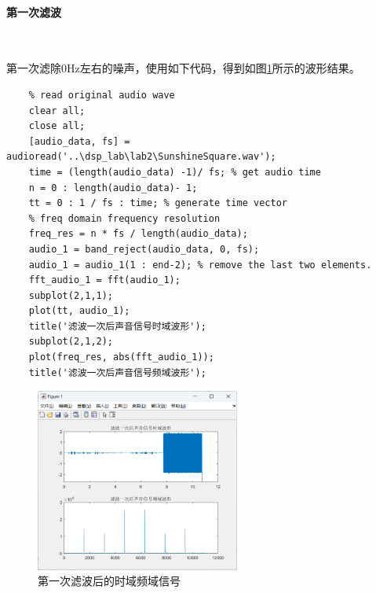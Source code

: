 \documentclass[UTF8]{ctexart}
\begin{document}
\paragraph{第一次滤波}~{}\par
第一次滤除0Hz左右的噪声，使用如下代码，得到如图\ref{img:2}所示的波形结果。
\begin{verbatim}
    % read original audio wave
    clear all;
    close all;
    [audio_data, fs] = audioread('..\dsp_lab\lab2\SunshineSquare.wav');
    time = (length(audio_data) -1)/ fs; % get audio time
    n = 0 : length(audio_data)- 1;
    tt = 0 : 1 / fs : time; % generate time vector
    % freq domain frequency resolution
    freq_res = n * fs / length(audio_data);
    audio_1 = band_reject(audio_data, 0, fs);
    audio_1 = audio_1(1 : end-2); % remove the last two elements.
    fft_audio_1 = fft(audio_1);
    subplot(2,1,1);
    plot(tt, audio_1);
    title('滤波一次后声音信号时域波形');
    subplot(2,1,2);
    plot(freq_res, abs(fft_audio_1));
    title('滤波一次后声音信号频域波形');
\end{verbatim}
\begin{figure}[htbp]
    \centering
    \includegraphics[width=0.6\textwidth]{2.png}
    \caption{第一次滤波后的时域频域信号}
    \label{img:2}
\end{figure}
\end{document}
